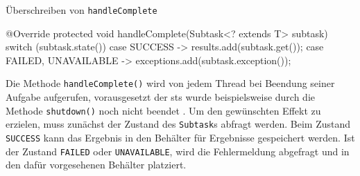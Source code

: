     \begin{program} [H]
        \caption{Überschreiben von \texttt{handleComplete}}
        \label{prog:ÜberschreibenVonHandleComplete}
    \begin{JavaCode}[language=Java, numbers=left]
@Override
protected void handleComplete(Subtask<? extends T> subtask) {
    switch (subtask.state()) {
        case SUCCESS -> results.add(subtask.get());
        case FAILED, UNAVAILABLE -> {
            exceptions.add(subtask.exception());
        }
    }
}\end{JavaCode}
    \end{program}
    Die Methode \texttt{handleComplete()} wird von jedem Thread bei Beendung seiner Aufgabe aufgerufen, vorausgesetzt der \gls{sts} wurde beispielsweise durch die Methode 
    \texttt{shut\-down()} noch nicht beendet \cite{oracle21STS}.
    Um den gewünschten Effekt zu erzielen, muss zunächst der Zustand des \texttt{Subtask}s abfragt werden. Beim Zustand \texttt{SUCCESS} kann das Ergebnis in den Behälter für Ergebnisse
    gespeichert werden. Ist der Zustand \texttt{FAILED} oder \texttt{UNAVAILABLE}, wird die Fehlermeldung abgefragt und in den dafür vorgesehenen Behälter platziert.

